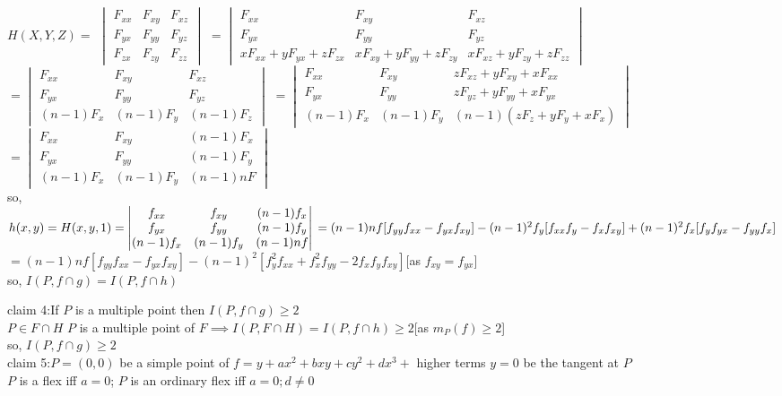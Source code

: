 \documentclass[11pt]{article}
\begin{document}
$H(X,Y,Z)=$ $\begin{vmatrix}
F_{xx} & F_{xy} & F_{xz}\\
F_{yx} & F_{yy} & F_{yz}\\
F_{zx} & F_{zy} & F_{zz}
\end{vmatrix}$
$=\begin{vmatrix}
F_{xx} & F_{xy} & F_{xz}\\
F_{yx} & F_{yy} & F_{yz}\\
xF_{xx}+yF_{yx}+zF_{zx} &xF_{xy}+yF_{yy}+zF_{zy} & xF_{xz}+yF_{zy}+zF_{zz}
\end{vmatrix}$
$=\begin{vmatrix}
F_{xx} & F_{xy} & F_{xz}\\
F_{yx} & F_{yy} & F_{yz}\\
(n-1)F_x & (n-1)F_y & (n-1)F_z
\end{vmatrix}$
$=\begin{vmatrix}
F_{xx} & F_{xy} & zF_{xz}+yF_{xy}+xF_{xx}\\
F_{yx} & F_{yy} & zF_{yz}+yF_{yy}+xF_{yx}\\
(n-1)F_x & (n-1)F_y & (n-1)(zF_z+yF_y+xF_x)
\end{vmatrix}$
$=\begin{vmatrix}
F_{xx} & F_{xy} & (n-1)F_x\\
F_{yx} & F_{yy} & (n-1)F_y\\
(n-1)F_x & (n-1)F_y & (n-1)nF
\end{vmatrix}$\\
so, $h(x,y)=H(x,y,1)=\begin{vmatrix}
f_{xx} & f_{xy} & (n-1)f_x\\
f_{yx} & f_{yy} & (n-1)f_y\\
(n-1)f_x & (n-1)f_y & (n-1)nf
\end{vmatrix}\\
=(n-1)nf[f_{yy}f_{xx}-f_{yx}f_{xy}]-(n-1)^2f_y[f_{xx}f_y-f_xf_{xy}]+(n-1)^2f_x[f_yf_{yx}-f_{yy}f_{x}]$\\
$=(n-1)nf[f_{yy}f_{xx}-f_{yx}f_{xy}]-(n-1)^2[f_y^2f_{xx}+f_x^2f_{yy}-2f_xf_yf_{xy}]$[as $f_{xy}=f_{yx}$]\\
so, $I(P,f\cap g)=I(P,f\cap h)$

claim 4:If $P$ is a multiple point then $I(P,f\cap g)\geq 2$\\
$P\in F\cap H$ $P$ is a multiple point of $F\implies I(P,F\cap H)=I(P,f\cap h)\geq 2$[as $m_P(f)\geq 2$]\\
so, $I(P,f\cap g)\geq 2$\\

claim 5:$P=(0,0)$ be a simple point of  $f=y+ax^2+bxy+cy^2+dx^3+$ higher terms $y=0$ be the tangent at $P$\\
$P$ is a flex iff $a=0$; $P$ is an ordinary flex iff $a=0;d\neq 0$\\
\end{document}
